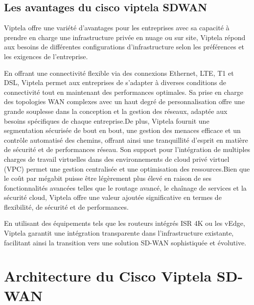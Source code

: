 \subsection{Les avantages du cisco viptela SDWAN }

Viptela offre une variété  d'avantages pour les entreprises avec sa capacité à prendre en charge une infrastructure privée en nuage ou sur site, Viptela répond aux besoins de différentes configurations d'infrastructure selon les préférences et les exigences de l'entreprise. 

En offrant une connectivité flexible via des connexions Ethernet, LTE, T1 et DSL, Viptela permet aux entreprises de s'adapter à diverses conditions de connectivité tout en maintenant des performances optimales. Sa prise en charge des topologies WAN complexes avec un haut degré de personnalisation offre une grande souplesse dans la conception et la gestion des réseaux, adaptée aux besoins spécifiques de chaque entreprise.De plus, Viptela fournit une segmentation sécurisée de bout en bout, une gestion des menaces efficace et un contrôle automatisé des chemins, offrant ainsi une tranquillité d'esprit en matière de sécurité et de performances réseau. Son support pour l'intégration de multiples charges de travail virtuelles dans des environnements de cloud privé virtuel (VPC) permet une gestion centralisée et une optimisation des ressources.Bien que le coût par mégabit puisse être légèrement plus élevé en raison de ses fonctionnalités avancées telles que le routage avancé, le chaînage de services et la sécurité cloud, Viptela offre une valeur ajoutée significative en termes de flexibilité, de sécurité et de performances.

En utilisant des équipements tels que les routeurs intégrés ISR 4K ou les vEdge, Viptela garantit une intégration transparente dans l'infrastructure existante, facilitant ainsi la transition vers une solution SD-WAN sophistiquée et évolutive.

\section{Architecture du Cisco Viptela SD-WAN }
